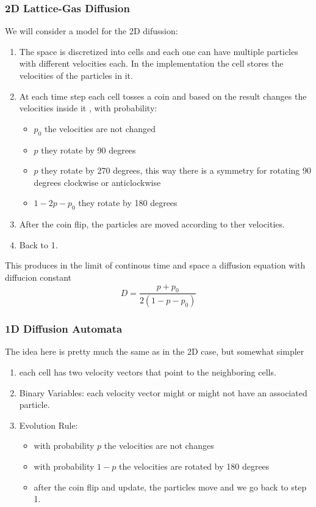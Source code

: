 \documentclass[11pt]{article}
\begin{document}
\subsubsection{2D Lattice-Gas Diffusion}
\label{sec:org10783a5}
We will consider a model for the 2D difussion:
\begin{enumerate}
\item The space is discretized into cells and each one can have multiple particles
with different velocities each. In the implementation the cell stores the velocities
of the particles in it.
\item At each time step each cell tosses a coin and based on the
result changes the velocities inside it , with probability:
\begin{itemize}
\item \(p_0\) the velocities are not changed
\item \(p\) they rotate by 90 degrees
\item \(p\) they rotate by 270 degrees, this way there is a symmetry for rotating 90
degrees clockwise or anticlockwise
\item \(1-2p-p_0\) they rotate by 180 degrees
\end{itemize}
\item After the coin flip, the particles are moved according to ther velocities.
\item Back to 1.
\end{enumerate}
This produces in the limit of continous time and space a diffusion equation with diffucion constant
$$D = \frac{p + p_0}{2(1-p-p_0)}$$
\subsubsection{1D Diffusion Automata}
\label{sec:org6c426d9}
The idea here is pretty much the same as in the 2D case, but somewhat simpler
\begin{enumerate}
\item each cell has two velocity vectors that point to the neighboring cells.
\item Binary Variables:  each velocity vector might or might not have an associated particle.
\item Evolution Rule:
\begin{itemize}
\item with probability \(p\) the velocities are not changes
\item with probability \(1-p\) the velocities are rotated by 180 degrees
\item after the coin flip and update, the particles move and we go back to step 1.
\end{itemize}
\end{enumerate}
\end{document}
